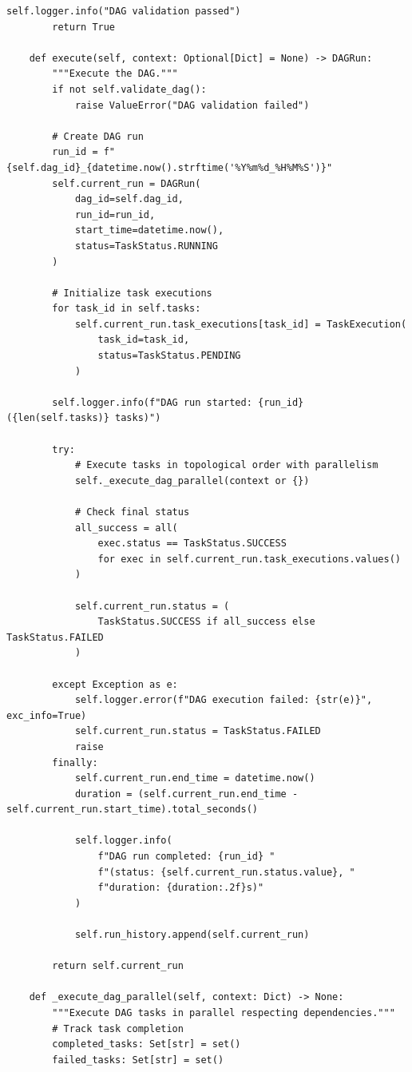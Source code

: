\begin{lstlisting}[style=python, caption=PipelineOrchestrator with Dependency Management]
        self.logger.info("DAG validation passed")
        return True

    def execute(self, context: Optional[Dict] = None) -> DAGRun:
        """Execute the DAG."""
        if not self.validate_dag():
            raise ValueError("DAG validation failed")

        # Create DAG run
        run_id = f"{self.dag_id}_{datetime.now().strftime('%Y%m%d_%H%M%S')}"
        self.current_run = DAGRun(
            dag_id=self.dag_id,
            run_id=run_id,
            start_time=datetime.now(),
            status=TaskStatus.RUNNING
        )

        # Initialize task executions
        for task_id in self.tasks:
            self.current_run.task_executions[task_id] = TaskExecution(
                task_id=task_id,
                status=TaskStatus.PENDING
            )

        self.logger.info(f"DAG run started: {run_id} ({len(self.tasks)} tasks)")

        try:
            # Execute tasks in topological order with parallelism
            self._execute_dag_parallel(context or {})

            # Check final status
            all_success = all(
                exec.status == TaskStatus.SUCCESS
                for exec in self.current_run.task_executions.values()
            )

            self.current_run.status = (
                TaskStatus.SUCCESS if all_success else TaskStatus.FAILED
            )

        except Exception as e:
            self.logger.error(f"DAG execution failed: {str(e)}", exc_info=True)
            self.current_run.status = TaskStatus.FAILED
            raise
        finally:
            self.current_run.end_time = datetime.now()
            duration = (self.current_run.end_time - self.current_run.start_time).total_seconds()

            self.logger.info(
                f"DAG run completed: {run_id} "
                f"(status: {self.current_run.status.value}, "
                f"duration: {duration:.2f}s)"
            )

            self.run_history.append(self.current_run)

        return self.current_run

    def _execute_dag_parallel(self, context: Dict) -> None:
        """Execute DAG tasks in parallel respecting dependencies."""
        # Track task completion
        completed_tasks: Set[str] = set()
        failed_tasks: Set[str] = set()


\end{lstlisting}
